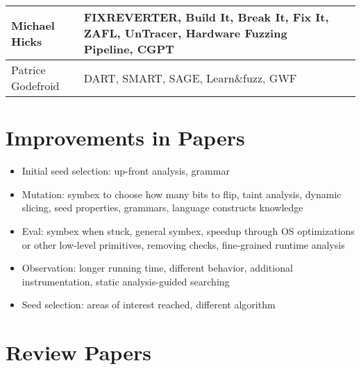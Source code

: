 \documentclass{article}
\begin{document}
\begin{longtable}{|l|p{}|l|}
  Michael Hicks     & FIXREVERTER\cite{FIXREVERTER}, Build It, Break It, Fix It\cite{BuildItBreakItFixIt}, ZAFL\cite{ZAFL}, UnTracer\cite{UnTracer}, Hardware Fuzzing Pipeline\cite{HardwareFuzzingPipeline}, CGPT\cite{CGPT}                                             & \cite{EvaluatingFuzzTesting}                     \\\hline
  Patrice Godefroid & DART\cite{DART}, SMART\cite{SMART}, SAGE\cite{SAGE}, Learn\&fuzz\cite{LearnFuzz}, GWF\cite{GWF}                                                                                                                                                     & \cite{PreliminaryAssessment}                     \\\hline
\end{longtable}

\pagebreak
\section{Improvements in Papers}
\begin{itemize}
  \item Initial seed selection: up-front analysis\cite{Skyfire, Orthrus, DIFUZE}, grammar\cite{QuickFuzz, QuickFuzz2}
  \item Mutation: symbex to choose how many bits to flip\cite{SYMFUZZ}, taint analysis\cite{Mayhem, Angora, Steelix, VUzzer}, dynamic slicing\cite{MutaGen}, seed properties\cite{SDF}, grammars\cite{SCADA, IMF}, language constructs knowledge\cite{Chizpurfle}
  \item Eval: symbex when stuck\cite{Driller, Mayhem}, general symbex\cite{S2F}, speedup through OS optimizations\cite{OS} or other low-level primitives\cite{IMF, VDF, kAFL}, removing checks\cite{TFuzz}, fine-grained runtime analysis\cite{MEDS}
  \item Observation: longer running time\cite{SlowFuzz}, different behavior\cite{NEZHA}, additional instrumentation\cite{Steelix, Angora}, static analysis-guided searching\cite{Dowser, VUzzer}
  \item Seed selection: areas of interest reached\cite{AFLGo, CGF, FairFuzz, VUzzer}, different algorithm\cite{SeedSelection, Scheduling}
\end{itemize}

\pagebreak
\section{Review Papers}
\end{document}
